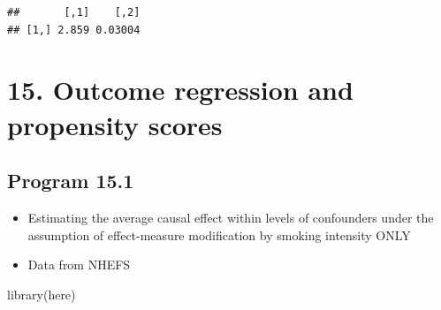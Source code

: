 \documentclass[
  10pt,
]{book}
\newenvironment{Shaded}{\begin{snugshade}}{\end{snugshade}}
\newcommand{\FunctionTok}[1]{\textcolor[rgb]{0.00,0.00,0.00}{#1}}
\newcommand{\NormalTok}[1]{#1}
\providecommand{\tightlist}{%
  \setlength{\itemsep}{0pt}\setlength{\parskip}{0pt}}
\begin{document}
\begin{verbatim}
##       [,1]    [,2]
## [1,] 2.859 0.03004
\end{verbatim}

\hypertarget{outcome-regression-and-propensity-scores}{%
\chapter*{15. Outcome regression and propensity scores}\label{outcome-regression-and-propensity-scores}}

\hypertarget{program-15.1}{%
\section{Program 15.1}\label{program-15.1}}

\begin{itemize}
\tightlist
\item
  Estimating the average causal effect within levels of confounders under the assumption of effect-measure modification by smoking intensity ONLY
\item
  Data from NHEFS
\end{itemize}

\begin{Shaded}
\begin{Highlighting}[]
\FunctionTok{library}\NormalTok{(here)}
\end{Highlighting}
\end{Shaded}
\end{document}
